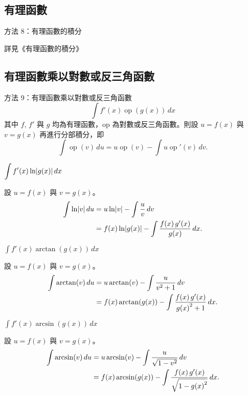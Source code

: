 \documentclass{beamer}
\newcommand{\Left} {\mathopen{}\mathclose\bgroup\left}
\newcommand{\Right}{\aftergroup\egroup\right}
\newcommand{\op}  {\operatorname{op}}
\theoremstyle{remark}
\begin{document}
\begin{CJK}{UTF8}{bsmi}
\subsection{有理函數}
\begin{frame}{方法 8：有理函數的積分}
  \centerline{詳見《有理函數的積分》}
\end{frame}

\subsection[有理函數乘以反函數]{有理函數乘以對數或反三角函數}
\begin{frame}{方法 9：有理函數乘以對數或反三角函數}
  \[\int f'(x) \op(g(x))\,dx\]
  其中 $f$, $f'$ 與 $g$ 均為有理函數，op 為對數或反三角函數。則設 $u = f(x)$ 與 $v = g(x)$ 再進行分部積分，即
  \[\int \op(v)\,du = u \op(v) - \int u \op'(v)\,dv.\]
\end{frame}

\begin{frame}{$\displaystyle \int f'(x) \ln \Left| g(x) \Right|\,dx$}
  \begin{solution}
    設 $u = f(x)$ 與 $v = g(x)$。
    \begin{align*}
      \int \ln \Left| v \Right|\,du &= u \ln \Left| v \Right| - \int \frac u v \,dv\\
	&= f(x) \ln \Left| g(x) \Right| - \int \frac{f(x)\,g'(x)}{g(x)}\,dx.
    \end{align*}
  \end{solution}
\end{frame}

\begin{frame}{$\displaystyle \int f'(x) \arctan(g(x))\,dx$}
  \begin{solution}
    設 $u = f(x)$ 與 $v = g(x)$。
    \begin{align*}
      \int \arctan(v)\,du &= u \arctan(v) - \int \frac{u}{v^2 + 1}\,dv\\
	&= f(x) \arctan(g(x)) - \int \frac{f(x)\,g'(x)}{g \Left( x \Right)^2 + 1}\,dx.
    \end{align*}
  \end{solution}
\end{frame}

\begin{frame}{$\displaystyle \int f'(x) \arcsin(g(x))\,dx$}
  \begin{solution}
    設 $u = f(x)$ 與 $v = g(x)$。
    \begin{align*}
      \int \arcsin(v)\,du &= u \arcsin(v) - \int \frac{u}{\sqrt{1 - v^2}}\,dv\\
	&= f(x) \arcsin(g(x)) - \int \frac{f(x)\,g'(x)}{\sqrt{1 - g \Left( x \Right)^2}}\,dx.
    \end{align*}
  \end{solution}
\end{frame}


\end{CJK}
\end{document}
